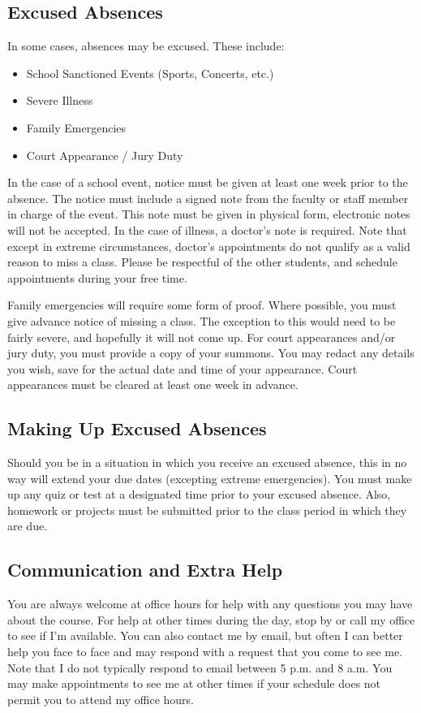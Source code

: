 \documentclass[11pt]{article}
\begin{document}
\subsection*{Excused Absences}
In some cases, absences may be excused. These include:
\begin{itemize}
    \item School Sanctioned Events (Sports, Concerts, etc.)
    \item Severe Illness
    \item Family Emergencies
    \item Court Appearance / Jury Duty
\end{itemize}
In the case of a school event, notice must be given at least one week
prior to the absence. The notice must include a signed note from the
faculty or staff member in charge of the event. This note must be
given in physical form, electronic notes will not be accepted.
In the case of illness, a doctor's note is required. Note that
except in extreme circumstances, doctor's appointments do not qualify as a valid reason to miss
a class. Please be respectful of the other students, and schedule
appointments during your free time.

Family emergencies will require some form of proof. Where possible,
you must give advance notice of missing a class. The exception to this
would need to be fairly severe, and hopefully it will not come up.
For court appearances and/or jury duty, you must provide a copy of
your summons. You may redact any details you wish, save for the
actual date and time of your appearance. Court appearances must be
cleared at least one week in advance.

\subsection*{Making Up Excused Absences}
Should you be in a situation in which you receive an excused absence,
this in no way will extend your due dates (excepting extreme
emergencies). You must make up any quiz or test at a designated time 
prior to your excused absence. Also, homework or projects must
be submitted prior to the class period in which they are due.

\subsection*{Communication and Extra Help}
You are always welcome at office hours for help with any
questions you may have about the course. For help at other times during the day, stop by or call my office to see if I'm available. You can also contact me by email, but often I can better help you face to face and may respond with a request that
you come to see me. Note that I do not typically respond to email between 5 p.m. and 8 a.m. You may make appointments to see me at other times if your schedule does not permit you to attend my office hours.
\end{document}
